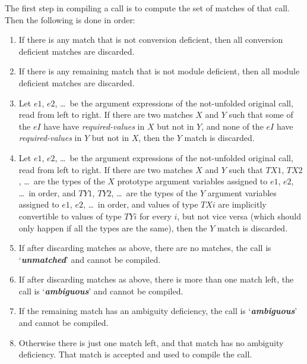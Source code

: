 \documentclass[12pt]{article}
\newcommand{\key}[1]{{\bf \em #1}\index{#1}}
\begin{document}
The first step in compiling a call is to compute the
set of matches of that call.  Then the following is done in order:

\begin{enumerate}

\item If there is any match that is not conversion deficient, then
all conversion deficient matches are discarded.

\item If there is any remaining match that is not module deficient, then
all module deficient matches are discarded.

\item\label{REQUIRED-ARGUMENTS-PREFERRED}
Let $e1$, $e2$, \ldots{}~be the argument expressions of
the not-unfolded original call, read from left to right.
If there are two matches $X$ and $Y$ such that
some of the $eI$ have
have {\em required-values} in $X$ but not in $Y$, and none of the $eI$
have {\em required-values} in $Y$ but not in $X$,
then the $Y$ match is discarded.

\item\label{MORE-RESTRICTIVE-ARGUMENT-TYPES-PREFERRED}
Let $e1$, $e2$, \ldots{}~be the argument expressions of
the not-unfolded original call, read from left to right.
If there are two matches $X$ and $Y$ such that
$TX1$, $TX2$, \ldots{}~are the types of the $X$ prototype argument
variables assigned to $e1$, $e2$, \ldots{}~in order, and
$TY1$, $TY2$, \ldots{}~are the types of the $Y$ argument
variables assigned to $e1$, $e2$, \ldots{}~in order,
and values of type
$TXi$ are implicitly convertible to values of type $TYi$ for
every $i$, but not vice versa (which should only happen if
all the types are the same),
then the $Y$ match is discarded.

\item If after discarding matches as above, there are no matches,
the call is `\key{unmatched}' and cannot be compiled.

\item If after discarding matches as above, there is more than one
match left,
the call is `\key{ambiguous}' and cannot be compiled.

\item If the remaining match has
an ambiguity deficiency,
the call is `\key{ambiguous}' and cannot be compiled.

\item Otherwise there is just one match left, and that
match has no ambiguity deficiency.  That match
is accepted and used to compile the call.

\end{enumerate}
\end{document}
